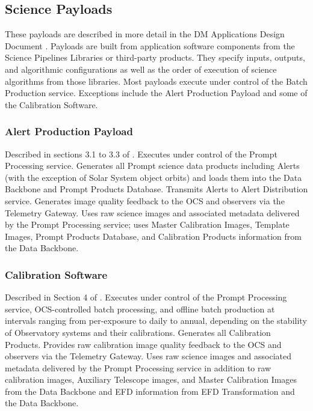 \documentclass[DM,toc,lsstdraft]{lsstdoc}
\begin{document}
\subsection{Science Payloads}\label{science-payloads}

These payloads are described in more detail in the DM Applications Design Document .
Payloads are built from application software components from the Science Pipelines Libraries or third-party products.
They specify inputs, outputs, and algorithmic configurations as well as the order of execution of science algorithms from those libraries.
Most payloads execute under control of the Batch Production service.
Exceptions include the Alert Production Payload and some of the Calibration Software.

\subsubsection{Alert Production Payload}\label{alert-production-payload}

Described in sections 3.1 to 3.3 of .
Executes under control of the Prompt Processing service. Generates all
Prompt science data products including Alerts (with the exception of
Solar System object orbits) and loads them into the Data Backbone and
Prompt Products Database. Transmits Alerts to Alert Distribution service.
Generates image quality feedback to the OCS and observers via the
Telemetry Gateway. Uses raw science images and
associated metadata delivered by the Prompt Processing service; uses
Master Calibration Images, Template Images, Prompt Products Database, and
Calibration Products information from the Data Backbone.

\subsubsection{Calibration Software}\label{calibration-software-payload}

Described in Section 4 of .
Executes under control of the Prompt Processing service, OCS-controlled batch processing, and offline batch production at intervals ranging from per-exposure to daily to annual, depending on the stability of Observatory systems and their calibrations.
Generates all Calibration Products.
Provides raw calibration image quality feedback to the OCS and observers via the
Telemetry Gateway. Uses raw science images and
associated metadata delivered by the Prompt Processing service in addition to raw calibration images, Auxiliary Telescope images, and Master
Calibration Images from the Data Backbone and EFD information from EFD Transformation and the Data Backbone.
\end{document}
